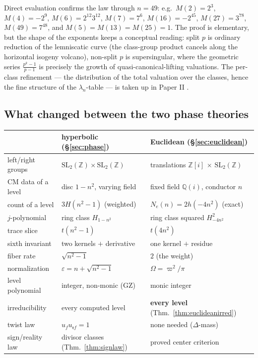 \documentclass[11pt]{amsart}
\numberwithin{equation}{section}
\theoremstyle{plain}
\theoremstyle{definition}
\theoremstyle{remark}
\newcommand{\Q}{\mathbb{Q}}
\newcommand{\Z}{\mathbb{Z}}
\newcommand{\Zi}{\Z[i]}
\newcommand{\SL}{\mathrm{SL}}
\newcommand{\idealr}{\mathfrak{r}}
\begin{document}
Direct evaluation confirms the law through $n = 49$: e.g.\ $M(2) =
2^3$, $M(4) = -2^9$, $M(6) = 2^{12}3^{12}$, $M(7) = 7^6$, $M(16) =
-2^{45}$, $M(27) = 3^{78}$, $M(49) = 7^{48}$, and $M(5) = M(13) =
M(25) = 1$.  The proof is elementary, but the shape of the exponents
keeps a conceptual reading: split $p$ is ordinary reduction of the
lemniscatic curve (the class-group product cancels along the
horizontal isogeny volcano), non-split $p$ is supersingular, where the
geometric series $\tfrac{p^k - 1}{p - 1}$ is precisely the growth of
quasi-canonical-lifting valuations.  The per-class refinement --- the
distribution of the total valuation over the classes, hence the fine
structure of the $\lambda_n$-table --- is taken up in Paper II
\cite{PaperII}.

\subsection{What changed between the two phase theories}

\begin{center}
\small
\begin{tabular}{@{}lll@{}}
\toprule
 & hyperbolic (\S\ref{sec:phase}) & Euclidean
(\S\ref{sec:euclidean})\\
\midrule
left/right groups & $\SL_2(\Z) \times \SL_2(\Z)$ & translations
$\Zi$ $\times$ $\SL_2(\Z)$\\
CM data of a level & disc $1 - n^2$, varying field & fixed field
$\Q(i)$, conductor $n$\\
count of a level & $3H(n^2 - 1)$ (weighted) & $N_e(n) = 2h(-4n^2)$
(exact)\\
$j$-polynomial & ring class $H_{1 - n^2}$ & ring class squared
$H_{-4n^2}^2$\\
trace slice & $t(n^2 - 1)$ & $t(4n^2)$\\
sixth invariant & two kernels $+$ derivative & one kernel $+$
residue\\
fiber rate & $\sqrt{n^2 - 1}$ & $2$ (the weight)\\
normalization & $\varepsilon = n + \sqrt{n^2 - 1}$ & $\Omega =
\varpi^2/\pi$\\
level polynomial & integer, non-monic (GZ) & monic integer\\
irreducibility & every computed level & \textbf{every level}
(Thm.~\ref{thm:euclideanirred})\\
twist law & $u_fu_{\idealr f} = 1$ & none needed ($\Delta$-mass)\\
sign/reality law & divisor classes (Thm.~\ref{thm:signlaw}) & proved
center criterion\\
\bottomrule
\end{tabular}
\end{center}
\end{document}
